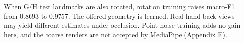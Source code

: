 When G/H test landmarks are also rotated, rotation training raises macro-F1 from 0.8693 to 0.9757. The offered geometry is learned. Real hand-back views may yield different estimates under occlusion. Point-noise training adds no gain here, and the coarse renders are not accepted by MediaPipe (Appendix E).
